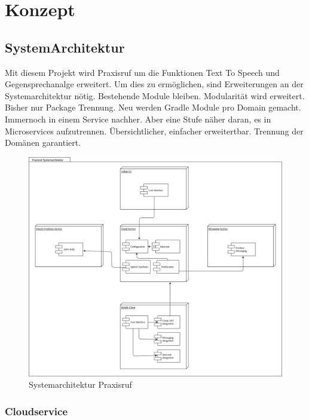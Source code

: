 \section{Konzept}

\subsection{SystemArchitektur}

Mit diesem Projekt wird Praxisruf um die Funktionen Text To Speech und Gegensprechanalge erweitert.
Um dies zu ermöglichen, sind Erweiterungen an der Systemarchitektur nötig.
Bestehende Module bleiben.
Modularität wird erweitert.
Bisher nur Package Trennung.
Neu werden Gradle Module pro Domain gemacht.
Immernoch in einem Service nachher.
Aber eine Stufe näher daran, es in Microservices aufzutrennen.
Übersichtlicher, einfacher erweitertbar.
Trennung der Domänen garantiert.

\begin{figure}[h]
    \centering
    \begin{minipage}[b]{0.9\textwidth}
        \includegraphics[width=\textwidth]{graphics/diagramms/Component_System_V01}
        \caption{Systemarchitektur Praxisruf}
    \end{minipage}
\end{figure}

\subsubsection*{Cloudservice}

